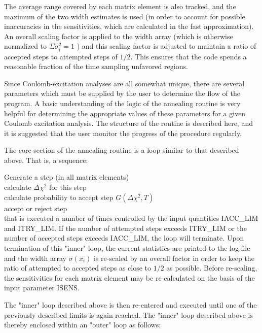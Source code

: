 \documentclass[10pt]{article}
\begin{document}
The average range covered by each matrix element is also tracked, and the maximum of the two width estimates is used (in order to account for possible inaccuracies in the sensitivities, which are calculated in the fast approximation). An overall scaling factor is applied to the width array (which is otherwise normalized to $\Sigma \sigma_{i}^{2}=1$ ) and this scaling factor is adjusted to maintain a ratio of accepted steps to attempted steps of $1 / 2$. This ensures that the code spends a reasonable fraction of the time sampling unfavored regions.

Since Coulomb-excitation analyses are all somewhat unique, there are several parameters which must be supplied by the user to determine the flow of the program. A basic understanding of the logic of the annealing routine is very helpful for determining the appropriate values of these parameters for a given Coulomb excitation analysis. The structure of the routine is described here, and it is suggested that the user monitor the progress of the procedure regularly.

The core section of the annealing routine is a loop similar to that described above. That is, a sequence:

\begin{displayquote}
Generate a step (in all matrix elements)\\
calculate $\Delta \chi^{2}$ for this step\\
calculate probability to accept step $G\left(\Delta \chi^{2}, T\right)$\\
accept or reject step\\
that is executed a number of times controlled by the input quantities IACC\_LIM and ITRY\_LIM. If the number of attempted steps exceeds ITRY\_LIM or the number of accepted steps exceeds IACC\_LIM, the loop will terminate. Upon termination of this "inner" loop, the current statistics are printed to the log file and the width array $\sigma\left(x_{i}\right)$ is re-scaled by an overall factor in order to keep the ratio of attempted to accepted steps as close to $1 / 2$ as possible. Before re-scaling, the sensitivities for each matrix element may be re-calculated on the basis of the input parameter ISENS.
\end{displayquote}

The "inner" loop described above is then re-entered and executed until one of the previously described limits is again reached. The "inner" loop described above is thereby enclosed within an "outer" loop as follows:
\end{document}
